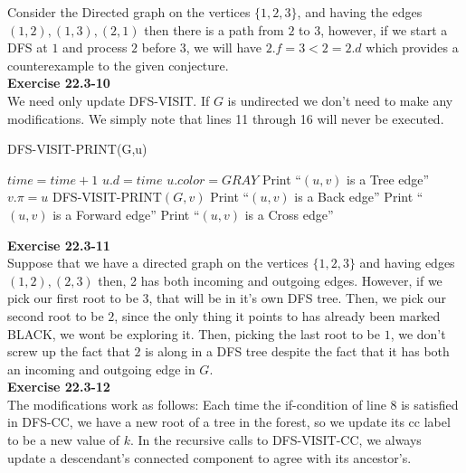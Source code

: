 \documentclass{article}
\begin{document}
Consider the Directed graph on the vertices $\{1,2,3\}$, and having the edges $(1,2),(1,3),(2,1)$ then there is a path from $2$ to $3$, however, if we start a DFS at $1$ and process $2$ before $3$, we will have $2.f = 3 < 2 = 2.d$ which provides a counterexample to the given conjecture.\\

\noindent\textbf{Exercise 22.3-10}\\

We need only update DFS-VISIT.  If $G$ is undirected we don't need to make any modifications.  We simply note that lines 11 through 16 will never be executed. \\
\begin{algorithm}
\caption{DFS-VISIT-PRINT(G,u)}
\begin{algorithmic}[1]
\State $time = time + 1$
\State $u.d = time$
\State $u.color = GRAY$
		\State Print ``$(u,v)$ is a Tree edge''
		\State $v.\pi = u$
		\State DFS-VISIT-PRINT$(G,v)$
		\State Print ``$(u,v)$ is a Back edge''
	\Else
			\State Print ``$(u,v)$ is a Forward edge''
		\Else
			\State Print ``$(u,v)$ is a Cross edge''
		\EndIf
	\EndIf
\EndFor 
\end{algorithmic}
\end{algorithm}

\noindent\textbf{Exercise 22.3-11}\\

Suppose that we have a directed graph on the vertices $\{1,2,3\}$ and having edges $(1,2),(2,3)$ then, 2 has both incoming and outgoing edges. However, if we pick our first root to be $3$, that will be in it's own DFS tree. Then, we pick our second root to be $2$, since the only thing it points to has already been marked BLACK, we wont be exploring it. Then, picking the last root to be $1$, we don't screw up the fact that $2$ is along in a DFS tree despite the fact that it has both an incoming and outgoing edge in $G$.\\

\noindent\textbf{Exercise 22.3-12}\\

The modifications work as follows:  Each time the if-condition of line 8 is satisfied in DFS-CC, we have a new root of a tree in the forest, so we update its cc label to be a new value of $k$.  In the recursive calls to DFS-VISIT-CC, we always update a descendant's connected component to agree with its ancestor's. \\
\end{document}
